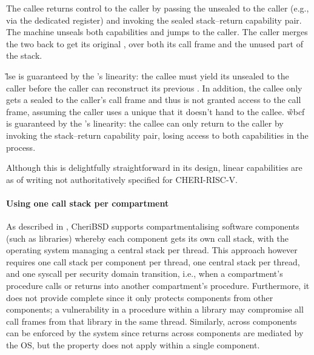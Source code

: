 \documentclass[main.tex]{subfiles}
\begin{document}
The callee returns control to the caller by passing the unsealed  to the caller (e.g., via the dedicated  register) and invoking the sealed stack–return capability pair. The machine unseals both capabilities and jumps to the caller. The caller merges the two  back to get its original , over both its call frame and the unused part of the stack.

\G{lse} is guaranteed by the 's linearity: the callee must yield its unsealed  to the caller before the caller can reconstruct its previous . In addition, the callee only gets a sealed  to the caller's call frame and thus is not granted access to the call frame, assuming the caller uses a unique  that it doesn't hand to the callee. \G{wbcf} is guaranteed by the 's linearity: the callee can only return to the caller by invoking the stack–return capability pair, losing access to both capabilities in the process.

Although this  is delightfully straightforward in its design, linear capabilities are as of writing not authoritatively specified for CHERI-RISC-V.

\paragraph{Using one call stack per compartment} As described in \cite{compartment}, CheriBSD supports compartmentalising software components (such as libraries) whereby each component gets its own call stack, with the operating system managing a central stack per thread. This approach however requires one call stack per component per thread, one central stack per thread, and one syscall per security domain transition, i.e., when a compartment's procedure calls or returns into another compartment's procedure. Furthermore, it does not provide complete  since it only protects components from other components; a vulnerability in a procedure within a library may compromise all call frames from that library in the same thread. Similarly,  across components can be enforced by the system since returns across components are mediated by the OS, but the property does not apply within a single component.

\biblio{}
\onlyinsubfile{\glsaddall\printglossaries}
\end{document}
